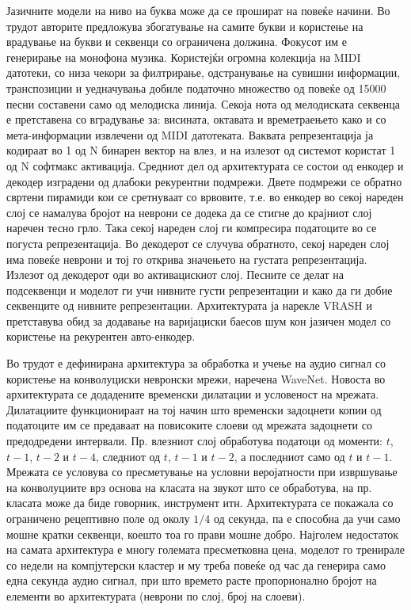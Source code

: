 Јазичните модели на ниво на буква може да се прошират на повеќе начини. Во трудот \cite{Tikhonov2017} авторите предложува збогатување на самите букви и користење на  врадување на букви и секвенци со ограничена должина. Фокусот им е генерирање на монофона музика. Користејќи огромна колекција на MIDI датотеки, со низа чекори за филтрирање, одстранување на сувишни информации, транспозиции и уедначувања добиле податочно множество од повеќе од 15000 песни составени само од мелодиска линија. Секоја нота од мелодиската секвенца е претставена со вградување за: висината, октавата и времетраењето како и со мета-информации извлечени од MIDI датотеката. Ваквата репрезентација ја кодираат во 1 од N бинарен вектор на влез, и на излезот од системот користат 1 од N софтмакс активација. Средниот дел од архитектурата се состои од енкодер и декодер изградени од длабоки рекурентни подмрежи. Двете подмрежи се обратно свртени пирамиди кои се сретнуваат со врвовите, т.е. во енкодер во секој нареден слој се намалува бројот на неврони се додека да се стигне до крајниот слој наречен тесно грло. Така секој нареден слој ги компресира податоците во се погуста репрезентација. Во декодерот се случува обратното, секој нареден слој има повеќе неврони и тој го открива значењето на густата репрезентација. Излезот од декодерот оди во активацискиот слој. Песните се делат на подсеквенци и моделот ги учи нивните густи репрезентации и како да ги добие секвенците од нивните репрезентации. Архитектурата ја нарекле VRASH и претставува обид за додавање на варијациски баесов шум кон јазичен модел со користење на рекурентен авто-енкодер.

Во трудот \cite{Oord2016} е дефинирана архитектура за обработка и учење на аудио сигнал со користење на конволуциски невронски мрежи, наречена WaveNet. Новоста во архитектурата се додадените временски дилатации и условеност на мрежата. Дилатациите функционираат на тој начин што временски задоцнети копии од податоците им се предаваат на повисоките слоеви од мрежата задоцнети со предодредени интервали. Пр. влезниот слој обработува податоци од моменти: $t$, $t-1$, $t-2$ и $t-4$, следниот од $t$, $t-1$ и $t-2$, а последниот само од $t$ и $t-1$. Мрежата се условува со пресметување на условни веројатности при извршување на конволуциите врз основа на класата на звукот што се обработува, на пр. класата може да биде говорник, инструмент итн. Архитектурата се покажала со ограничено рецептивно поле од околу $1/4$ од секунда, па е способна да учи само мошне кратки секвенци, коешто тоа го прави мошне добро. Најголем недостаток на самата архитектура е многу големата пресметковна цена, моделот го тренирале со недели на компјутерски кластер и му треба повеќе од час да генерира само една секунда аудио сигнал, при што времето расте пропорионално бројот на елементи во архитектурата (неврони по слој, број на слоеви).

